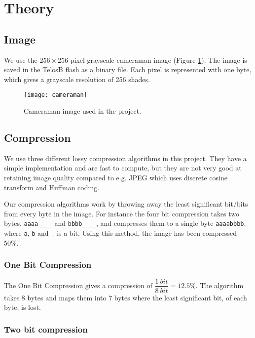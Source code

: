 \section{Theory}

\subsection{Image}
We use the $256 \times 256$ pixel grayscale cameraman image (Figure \ref{fig:image_cameraman}). 
The image is saved in the TelosB flash as a binary file. Each pixel is represented with one byte, which gives a grayscale resolution of 256 shades.

\begin{figure}[ht!]
\centering
\texttt{[image: cameraman]}
\caption{Cameraman image used in the project.}
\label{fig:image_cameraman}
\end{figure}

\subsection{Compression}

We use three different lossy compression algorithms in this project.
They have a simple implementation and are fast to compute, but they are not very good at retaining image quality compared to e.g. JPEG which uses discrete cosine transform and Huffman coding.

Our compression algorithms work by throwing away the least significant bit/bits from every byte in the image.
For instance the four bit compression takes two bytes, \texttt{aaaa\_\_\_\_} and \texttt{bbbb\_\_\_\_}, and compresses them to a single byte \texttt{aaaabbbb}, where \texttt{a}, \texttt{b} and \texttt{\_} is a bit. Using this method, the image has been compressed 50\%.


\subsubsection{One Bit Compression} %
\label{sub:one_bit_compression}

The One Bit Compression gives a compression of $\dfrac{1\ bit}{8\ bit} = 12.5\%$.
The algorithm takes 8 bytes and maps them into 7 bytes where the least significant bit, of each byte, is lost.

\subsubsection{Two bit compression} %
\label{sub:two_bit_compression}

